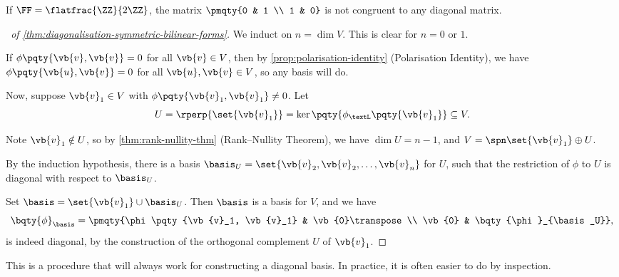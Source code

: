 \begin{example}
    If \(\FF = \flatfrac{\ZZ}{2 \ZZ}\), the matrix \(\pmqty{0 & 1 \\ 1 & 0}\) is not congruent to any diagonal matrix.
\end{example}

\begin{proof}[\proofname\ of \autoref{thm:diagonalisation-symmetric-bilinear-forms}]
    We induct on \(n = \dim V\). This is clear for \(n = 0\) or \(1\).

    If \(\phi\pqty{\vb{v}, \vb{v}} = 0\) for all \(\vb{v} \in V\), then by \autoref{prop:polarisation-identity} (Polarisation Identity), we have \(\phi\pqty{\vb{u}, \vb{v}} = 0\) for all \(\vb{u}, \vb{v} \in V\), so any basis will do.

    Now, suppose \(\vb{v}_1 \in V\) with \(\phi\pqty{\vb{v}_1, \vb{v}_1} \neq 0\). Let
    \[
        U = \rperp{\set{\vb{v}_1}} = \ker \pqty{\phi_{\textL}\pqty{\vb{v}_1}} \subseteq V.
    \]

    Note \(\vb{v}_1 \notin U\), so by \autoref{thm:rank-nullity-thm} (Rank--Nullity Theorem), we have \(\dim U = n - 1\), and \(V = \spn\set{\vb{v}_1} \oplus U\).

    By the induction hypothesis, there is a basis \(\basis_U = \set{\vb{v}_2, \vb{v}_2, \ldots, \vb{v}_{n}}\) for \(U\), such that the restriction of \(\phi\) to \(U\) is diagonal with respect to \(\basis_U\).

    Set \(\basis = \set{\vb{v}_1} \cup \basis_U\). Then \(\basis\) is a basis for \(V\), and we have
    \[
        \bqty{\phi}_{\basis} = \pmqty{\phi\pqty{\vb{v}_1, \vb{v}_1} & \vb{0}\transpose \\ \vb{0} & \bqty{\phi}_{\basis_U}},
    \]
    is indeed diagonal, by the construction of the orthogonal complement \(U\) of \(\vb{v}_1\).
\end{proof}

\begin{remark}
    This is a procedure that will always work for constructing a diagonal basis. In practice, it is often easier to do by inspection.
\end{remark}

